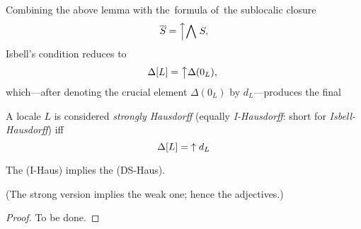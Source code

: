 Combining the above lemma with the~formula of~the sublocalic closure
\[
  \overline{S} = \left\uparrow \bigwedge \right. S,
\]
Isbell's condition reduces to
\[
  \Delta[L] = \left\uparrow \Delta(0_L),\right.
\]
which---after denoting the crucial element $\Delta(0_L)$ by $d_L$---produces
the final

\begin{framed}
  \begin{df}[I-Haus]
    A locale $L$ is considered \emph{strongly Hausdorff\/} (equally
    \emph{I-Hausdorff}: short for \emph{Isbell-Hausdorff}) iff
    \[
      \Delta[L] = \left\uparrow\right. d_L
    \]
  \end{df}
\end{framed}

\begin{prop} \label{IHaus->DSHaus}
  The (I-Haus) implies the (DS-Haus).
\end{prop}
(The strong version implies the weak one; hence the adjectives.)
\begin{proof}
  To be done.
\end{proof}
